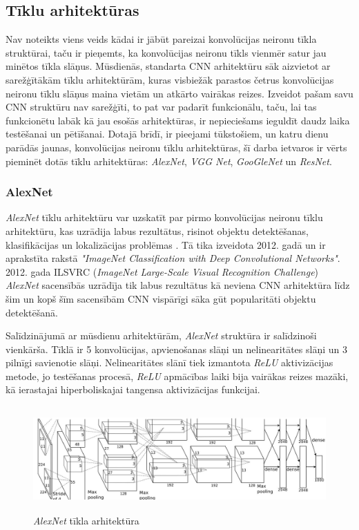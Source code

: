 \subsection{Tīklu arhitektūras}
Nav noteikts viens veids kādai ir jābūt pareizai konvolūcijas neironu tīkla struktūrai, taču ir pieņemts, ka konvolūcijas neironu tīkls vienmēr satur jau minētos tīkla slāņus. Mūsdienās, standarta CNN arhitektūru sāk aizvietot ar sarežģītākām tīklu arhitektūrām, kuras visbiežāk parastos četrus konvolūcijas neironu tīklu slāņus maina vietām un atkārto vairākas reizes. Izveidot pašam savu CNN struktūru nav sarežģīti, to pat var padarīt funkcionālu, taču, lai tas funkcionētu labāk kā jau esošās arhitektūras, ir nepieciešams ieguldīt daudz laika testēšanai un pētīšanai. Dotajā brīdī, ir pieejami tūkstošiem, un katru dienu parādās jaunas, konvolūcijas neironu tīklu arhitektūras, šī darba ietvaros ir vērts pieminēt dotās tīklu arhitektūras: \textit{AlexNet}, \textit{VGG Net}, \textit{GooGleNet} un \textit{ResNet}.

\subsubsection{AlexNet}

\textit{AlexNet} tīklu arhitektūru var uzskatīt par pirmo konvolūcijas neironu tīklu arhitektūru, kas uzrādija labus rezultātus, risinot objektu detektēšanas, klasifikācijas un lokalizācijas problēmas \cite{ILSVRC15}. Tā tika izveidota 2012. gadā un ir aprakstīta rakstā \textit{"ImageNet Classification with Deep Convolutional Networks"}\cite{krizhevsky2012imagenet}. 2012. gada ILSVRC (\textit{ImageNet Large-Scale Visual Recognition Challenge}) \textit{AlexNet} sacensībās uzrādīja tik labus rezultātus kā neviena CNN arhitektūra līdz šim \cite{ILSVRC15} un kopš šīm sacensībām CNN vispārīgi sāka gūt popularitāti objektu detektēšanā. 

Salīdzinājumā ar mūsdienu arhitektūrām, \textit{AlexNet} struktūra ir salīdzinoši vienkārša. Tīklā ir 5 konvolūcijas, apvienošanas slāņi un nelinearitātes slāņi un 3 pilnīgi savienotie slāņi. Nelinearitātes slānī tiek izmantota \textit{ReLU} aktivizācijas metode, jo testēšanas procesā, \textit{ReLU} apmācības laiki bija vairākas reizes mazāki, kā ierastajai hiperboliskajai tangensa aktivizācijas funkcijai. 
\begin{figure}[h]%
	\centering
	\includegraphics[height=4cm]{images/alexnet.jpg} %
	\caption{\textit{AlexNet} tīkla arhitektūra \cite{alexnetimage}}%
	\label{fig:example}%
\end{figure}
